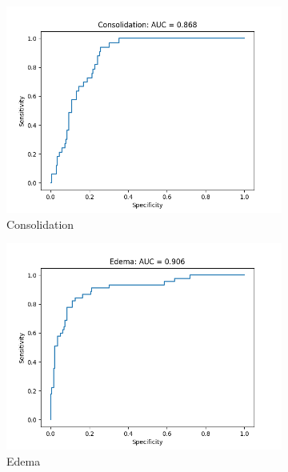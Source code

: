 \documentclass{amia}
\begin{document}
\begin{figure}[th]
\begin{subfigure}{0.19\linewidth}
	\centering
	\includegraphics[width=\linewidth]{Consolidation_roc.png}
	\caption{Consolidation}\label{ROC_Consolidation}
\end{subfigure}
\begin{subfigure}{0.19\linewidth}
	\centering
	\includegraphics[width=\linewidth]{Edema_roc.png}
	\caption{Edema}\label{ROC_Edema}
\end{subfigure}
\begin{subfigure}{0.19\linewidth}
	\centering

\end{subfigure}
\end{figure}
\end{document}
